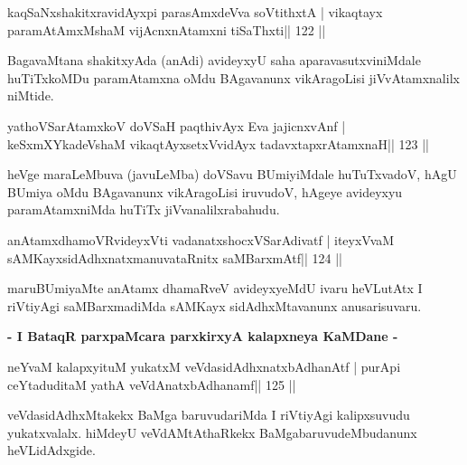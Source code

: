 
\begin{shl}
kaqSaNxshakitxravidAyx\s pi parasAmxdeVva soVtithxtA |
vikaqtayx paramAtAmxMshaM vijAcnxnAtamxni tiSaThxti\hfill || 122 ||
\end{shl}

\begin{artha}
BagavaMtana shakitxyAda (anAdi) avideyxyU saha aparavasutxviniMdale huTiTxkoMDu paramAtamxna oMdu BAgavanunx vikAragoLisi jiVvAtamxnalilx niMtide.
\end{artha}


\begin{shl}
yathoVSarAtamxkoV doVSaH paqthivAyx Eva jajicnxvAnf |
keSxmXYkadeVshaM vikaqtAyx\s\s setxV\s vidAyx tadavxtapxrAtamxnaH\hfill || 123 ||
\end{shl}

\begin{artha}
heVge maraLeMbuva (javuLeMba) doVSavu BUmiyiMdale huTuTxvadoV, hAgU BUmiya oMdu
BAgavanunx vikAragoLisi iruvudoV, hAgeye avideyxyu paramAtamxniMda
huTiTx jiVvanalilxrabahudu.
\end{artha}


\begin{shl}
anAtamxdhamoVR\s videyxVti vadanatxshocxVSarAdivatf |
iteyxVvaM sAMKayxsidAdhxnatxmanuvataRnitx saMBarxmAtf\hfill || 124 ||
\end{shl}

\begin{artha}
maruBUmiyaMte anAtamx dhamaRveV avideyxyeMdU ivaru heVLutAtx I riVtiyAgi saMBarxmadiMda sAMKayx sidAdhxMtavanunx anusarisuvaru.
\end{artha}

\begin{center}
\textbf{- I BataqR parxpaMcara parxkirxyA kalapxneya KaMDane -}
\end{center}

\begin{shl}
neYvaM kalapxyituM yukatxM veVdasidAdhxnatxbAdhanAtf |
purA\s pi ceYtaduditaM yathA veVdAnatxbAdhanamf\hfill || 125 ||
\end{shl}

\begin{artha}
veVdasidAdhxMtakekx BaMga baruvudariMda I riVtiyAgi kalipxsuvudu yukatxvalalx. hiMdeyU veVdAMtAthaRkekx BaMgabaruvudeMbudanunx heVLidAdxgide.
\end{artha}

